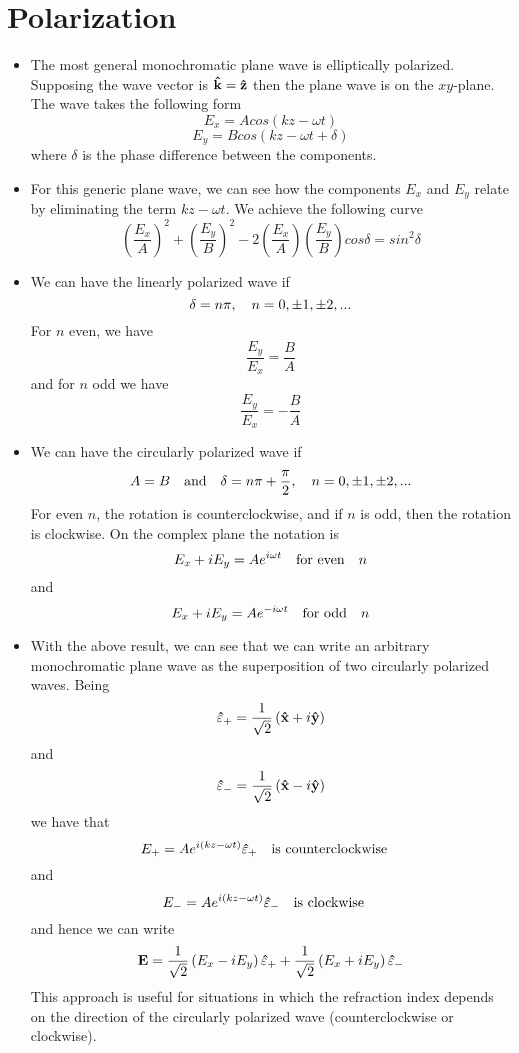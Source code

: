 \documentclass[oneside, 10pt, notitlepage]{book}
\begin{document}
\section{Polarization}
\begin{itemize}
    \item The most general monochromatic plane wave is elliptically polarized. Supposing the wave vector is $\vu{k} = \vu{z}$ then the plane wave is on the $xy$-plane. The wave takes the following form
    $$E_x = Acos\left(kz-\omega t\right)$$
    $$E_y = Bcos\left(kz-\omega t + \delta \right)$$
    where $\delta$ is the phase difference between the components.
    \item For this generic plane wave, we can see how the components $E_x$ and $E_y$ relate by eliminating the term $kz-\omega t$. We achieve the following curve
    $$\left(\frac{E_x}{A}\right)^2 + \left(\frac{E_y}{B}\right)^2 - 2\left(\frac{E_x}{A}\right)\left(\frac{E_y}{B}\right)cos\delta = sin^2\delta$$
    \item We can have the linearly polarized wave if
    $$\delta = n\pi \qc n=0,\pm1, \pm2,...$$
    For $n$ even, we have
    $$\frac{E_y}{E_x} = \frac{B}{A}$$
    and for $n$ odd we have
    $$\frac{E_y}{E_x} = -\frac{B}{A}$$
    \item We can have the circularly polarized wave if
    $$A=B \qq{and} \delta =n\pi + \frac{\pi}{2}\qc n=0,\pm1,\pm2,...$$
    For even $n$, the rotation is counterclockwise, and if $n$ is odd, then the rotation is clockwise. On the complex plane the notation is
    $$E_x + iE_y = Ae^{i\omega t}\qq{for even} n$$
    and
    $$E_x + iE_y = Ae^{-i\omega t}\qq{for odd} n$$
    \item With the above result, we can see that we can write an arbitrary monochromatic plane wave as the superposition of two circularly polarized waves. Being
    $$\vu{\varepsilon}_+ = \frac{1}{\sqrt{2}}\left(\vu{x} + i\vu{y} \right)$$
    and
    $$\vu{\varepsilon}_- = \frac{1}{\sqrt{2}}\left(\vu{x} - i\vu{y} \right)$$
    we have that
    $$E_+ = Ae^{i(kz-\omega t)}\vu{\varepsilon}_+\qq{is counterclockwise}$$
    and
    $$E_- = Ae^{i(kz-\omega t)}\vu{\varepsilon}_-\qq{is clockwise}$$
    and hence we can write
    $$\vb{E} = \frac{1}{\sqrt{2}}\left(E_x-iE_y\right)\vu{\varepsilon}_+ +\frac{1}{\sqrt{2}}\left(E_x+iE_y\right)\vu{\varepsilon}_-$$
    This approach is useful for situations in which the refraction index depends on the direction of the circularly polarized wave (counterclockwise or clockwise).
\end{itemize}
\end{document}

